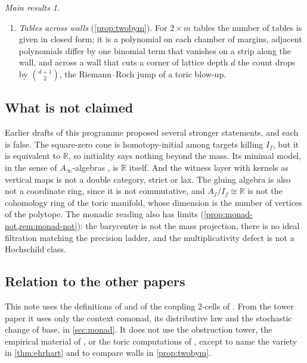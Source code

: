 \documentclass[11pt]{article}
\theoremstyle{definition}
\theoremstyle{remark}
\newtheorem*{mainthm}{Main results}
\newcommand{\R}{\mathbb{R}}
\newcommand{\Cpl}{\operatorname{Cpl}}
\begin{document}
\begin{mainthm}
\begin{enumerate}[label=(\Alph*),leftmargin=*]
  $N\cdot\Cpl(f,g)$ is a lattice polytope with the integer decomposition property. Its Ehrhart ring is generated in degree
  one, its Hilbert function counts integer tables, and its $\operatorname{Proj}$ is the toric variety of the coupling
  polytope. Its degree-one basis is the sample space of Fisher's exact test, connected by basic moves that are integer
  circulations.
\item \emph{Tables across walls} (\cref{prop:twobym}). For $2\times m$ tables the number of tables is given in closed form; it is a
  polynomial on each chamber of margins, adjacent polynomials differ by one binomial term that vanishes on a strip along
  the wall, and across a wall that cuts a corner of lattice depth $d$ the count drops by $\binom{d+1}2$, the Riemann--Roch
  jump of a toric blow-up.
\end{enumerate}
\end{mainthm}

\subsection{What is not claimed} Earlier drafts of this programme proposed several stronger statements, and each is false.
The square-zero cone is homotopy-initial among targets killing $I_f$, but it is equivalent to $\R$, so initiality says nothing
beyond the mass. Its minimal model, in the sense of $A_\infty$-algebras \cite{Keller2001}, is $\R$ itself. And the witness
layer with kernels as vertical maps is not a double category, strict or lax. The gluing algebra is also not a coordinate ring,
since it is not commutative, and $A_f/I_f\cong\R$ is not the cohomology ring of the toric manifold, whose dimension is the
number of vertices of the polytope. The monadic reading also has limits (\cref{prop:monad-not,rem:monad-not}): the barycenter is not
the mass projection, there is no ideal filtration matching the precision ladder, and the multiplicativity defect is not a
Hochschild class.

\subsection{Relation to the other papers} This note uses the definitions of \cite[\S\S2, 5, 10]{Conditionals} and of the
coupling 2-cells of \cite[\S7]{Attribution}. From the tower paper \cite{Tower} it uses only the context comonad, its distributive law and the stochastic change of base, in
\cref{sec:monad}. It does not use the obstruction tower, the empirical material of
\cite{ThreeLayers}, or the toric computations of \cite{Family}, except to name the variety in \cref{thm:ehrhart} and to compare
walls in \cref{prop:twobym}.
\end{document}
